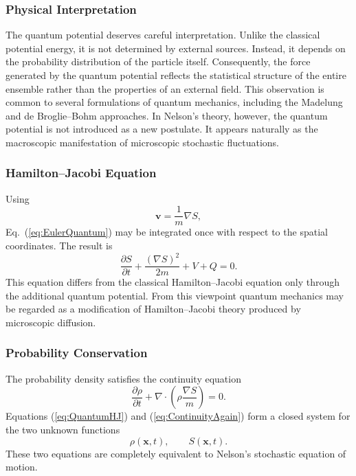 \subsubsection*{Physical Interpretation}
The quantum potential deserves careful interpretation.
Unlike the classical potential energy, it is not determined by external
sources.
Instead, it depends on the probability distribution of the particle
itself.
Consequently, the force generated by the quantum potential reflects the
statistical structure of the entire ensemble rather than the properties
of an external field.
This observation is common to several formulations of quantum mechanics,
including the Madelung and de Broglie--Bohm approaches.
In Nelson's theory, however, the quantum potential is not introduced as
a new postulate.
It appears naturally as the macroscopic manifestation of microscopic
stochastic fluctuations.
\subsubsection*{Hamilton--Jacobi Equation}
Using
\[\mathbf v=\frac{1}{m}\nabla S,\]
Eq.~(\ref{eq:EulerQuantum}) may be integrated once with respect to the
spatial coordinates.
The result is
\begin{equation}
\boxed{\frac{\partial S}{\partial t}+\frac{(\nabla S)^2}{2m}+V+Q=0.}
\label{eq:QuantumHJ}
\end{equation}
This equation differs from the classical Hamilton--Jacobi equation only
through the additional quantum potential.
From this viewpoint quantum mechanics may be regarded as a modification
of Hamilton--Jacobi theory produced by microscopic diffusion.
\subsubsection*{Probability Conservation}
The probability density satisfies the continuity equation
\begin{equation}
\boxed{\frac{\partial\rho}{\partial t}+
\nabla\cdot\left(\rho\frac{\nabla S}{m}\right)=0.}
\label{eq:ContinuityAgain}
\end{equation}
Equations
(\ref{eq:QuantumHJ})
and
(\ref{eq:ContinuityAgain})
form a closed system for the two unknown functions
\[\rho(\mathbf x,t),\qquad S(\mathbf x,t).\]
These two equations are completely equivalent to Nelson's stochastic
equation of motion.
